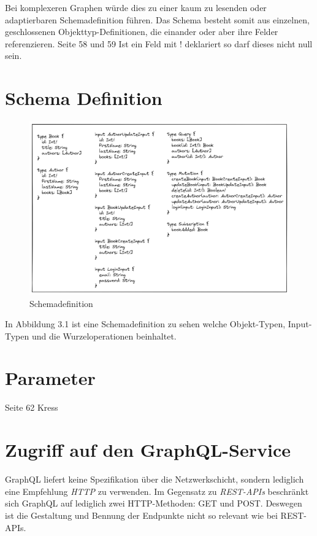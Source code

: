 Bei komplexeren Graphen würde dies zu einer kaum zu lesenden oder adaptierbaren Schemadefinition führen.
Das Schema besteht somit aus einzelnen, geschlossenen Objekttyp-Definitionen, die einander oder aber ihre Felder referenzieren. Seite 58 und 59
Ist ein Feld mit ! deklariert so darf dieses nicht null sein.

\section{Schema Definition}

\begin{figure}[H]
    \includegraphics[width=\textwidth]{pics/schema.png}
    \caption{Schemadefinition}
\end{figure}

In Abbildung 3.1 ist eine Schemadefinition zu sehen welche Objekt-Typen, Input-Typen und die Wurzeloperationen beinhaltet.

\section{Parameter}
Seite 62 Kress

\section{Zugriff auf den GraphQL-Service}
GraphQL liefert keine Spezifikation über die Netzwerkschicht, sondern lediglich eine Empfehlung \textit{HTTP} zu verwenden.
Im Gegensatz zu \textit{REST-APIs} beschränkt sich GraphQL auf lediglich zwei HTTP-Methoden: GET und POST.
Deswegen ist die Gestaltung und Bennung der Endpunkte nicht so relevant wie bei REST-APIs.
\newline

